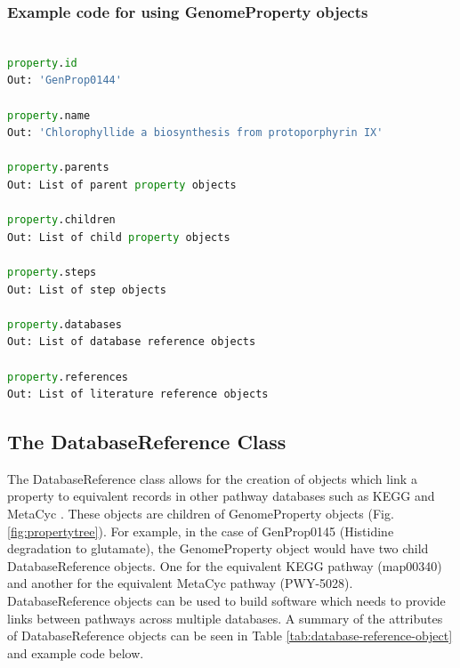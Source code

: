 \subsubsection{Example code for using GenomeProperty objects}

\begin{lstlisting}[language=Python]

property.id
Out: 'GenProp0144'
	
property.name
Out: 'Chlorophyllide a biosynthesis from protoporphyrin IX'

property.parents
Out: List of parent property objects

property.children	
Out: List of child property objects

property.steps
Out: List of step objects		
	
property.databases
Out: List of database reference objects

property.references
Out: List of literature reference objects

\end{lstlisting}

\subsection{The DatabaseReference Class}

The DatabaseReference class allows for the creation of objects which link a property to equivalent records in other pathway databases such as KEGG \cite{kanehisa2000kegg} and MetaCyc \cite{karp2002MetaCyc}. These objects are children of GenomeProperty objects (Fig. \ref{fig:propertytree}). For example, in the case of GenProp0145 (Histidine degradation to glutamate), the GenomeProperty object would have two child DatabaseReference objects. One for the equivalent KEGG pathway (map00340) and another for the equivalent MetaCyc pathway (PWY-5028). DatabaseReference objects can be used to build software which needs to provide links between pathways across multiple databases. A summary of the attributes of DatabaseReference objects can be seen in Table \ref{tab:database-reference-object} and example code below.

